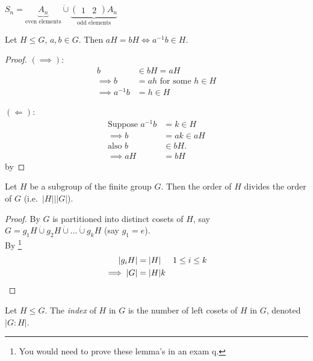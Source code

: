 \begin{example}
$S_n = \underbrace{A_n}_\text{even elements} \mathbin{\dot{\cup}} \underbrace{\begin{pmatrix}1 & 2\end{pmatrix} A_n}_\text{odd elements}$
\end{example}

\begin{lemma}
\protect\hypertarget{lem:eleven}{}\label{lem:eleven}
Let $H \leq G$, $a, b \in G$.
Then $aH = bH \iff a^{-1} b \in H$.
\end{lemma}

\begin{proof}
$(\implies)$:
\begin{align*}
    b &\in bH = aH \\
    \implies b &= ah \text{ for some } h \in H \\
    \implies a^{-1} b &= h \in H
\end{align*}

$(\Longleftarrow)$:
\begin{align*}
    \text{Suppose } a^{-1}b &= k \in H \\
    \implies b &= ak \in aH \\
    \text{also } b &\in bH. \\
    \implies aH &= bH
\end{align*} by 
\end{proof}

\begin{theorem}
\protect\hypertarget{thm:three}{}\label{thm:three}
Let $H$ be a subgroup of the finite group $G$.
Then the order of $H$ divides the order of $G$ (i.e.~$|H| \bigg| |G|$).
\end{theorem}

\begin{proof}
By  $G$ is partitioned into distinct cosets of $H$, say $G = g_1 H \mathbin{\dot{\cup}} g_2 H \mathbin{\dot{\cup}} \ldots \mathbin{\dot{\cup}} g_k H$ (say $g_1 = e$).\\
By \footnote{You would need to prove these lemma's in an exam q.}
\begin{align*}
    |g_i H| &= |H| \hspace{.5cm} 1 \leq i \leq k \\
    \implies |G| &= |H|k
\end{align*}
\end{proof}

\begin{definition}
\protect\hypertarget{def:fourteen}{}\label{def:fourteen}
Let $H \leq G$.
The \emph{index} of $H$ in $G$ is the number of left cosets of $H$ in $G$, denoted $|G : H|$.
\end{definition}

